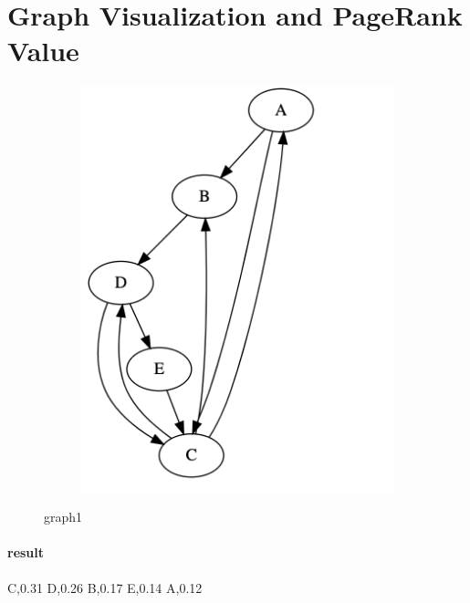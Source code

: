\documentclass{article}
\begin{document}
    \newpage

\section{Graph Visualization and PageRank Value}

\begin{figure}[h!]
  \centering
  \begin{subfigure}[b]{.6\linewidth}
    \includegraphics[width=\linewidth]{graph1.jpg}
  \end{subfigure}
  \caption{graph1}

  \end{figure}
  \paragraph{result}
 C,0.31
D,0.26
B,0.17
E,0.14
A,0.12

    \newpage
\end{document}
